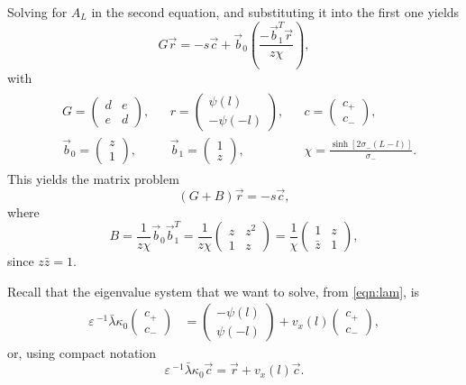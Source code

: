 \documentclass[a4paper,10pt]{article}
\newcommand{\lA}{\ensuremath{\lambda}}
\newcommand{\sI}{\ensuremath{\sigma}}
\newcommand{\kA}{\ensuremath{\kappa}}
\newcommand{\Ep}{\ensuremath{\varepsilon\,}}
\begin{document}
Solving for $A_L$ in the second equation, and substituting it into the first one yields
% 
\begin{equation*}
  G\vec{r} = -s\vec{c} + \vec{b}_0\left(\frac{-\vec{b}_1^T\vec{r}}{z\chi}\right),
\end{equation*}
% 
with 
% 
\begin{equation*}
	\begin{split}
	\begin{aligned}
	&G = \begin{pmatrix} d&e\\e&d\end{pmatrix},
	&&r = \begin{pmatrix} \psi(l)\\ -\psi(-l)\end{pmatrix},
	&&c = \begin{pmatrix} c_+\\ c_-\end{pmatrix},\\
	&\vec{b}_0 = \begin{pmatrix} z\\ 1\end{pmatrix},
	&&\vec{b}_1 = \begin{pmatrix} 1\\ z\end{pmatrix},
	&&\chi = \frac{\sinh[2\sI_-(L-l)]}{\sI_-}.
	\end{aligned}
	\end{split}
\end{equation*}
% 
This yields the matrix problem
% 
\begin{equation}
\label{eqn:reqn1}
  (G+B)\vec{r} = -s\vec{c},
\end{equation}
% 
where 
% 
\[
  B = \frac{1}{z\chi}\vec{b}_0\vec{b}_1^T = \frac{1}{z\chi}\begin{pmatrix} z&z^2\\1& z\end{pmatrix} =
  \frac{1}{\chi}\begin{pmatrix} 1&z\\ \bar{z}& 1\end{pmatrix},
\]
% 
since $z\bar{z}=1$.

Recall that the eigenvalue system that we want to solve, from \eqref{eqn:lam}, is
% 
\begin{equation*}
	\begin{split}
	\Ep^{-1}\bar{\lA}\kA_0\begin{pmatrix}c_+\\c_-\end{pmatrix}
   &=
	\begin{pmatrix} -\psi(l) \\ \psi(-l) \end{pmatrix}
	 +v_x(l) \begin{pmatrix}c_+\\c_-\end{pmatrix},
	\end{split}
\end{equation*}
%
or, using compact notation
% 
\begin{equation}
\label{eqn:reqn2}
 \Ep^{-1}\bar{\lA}\kA_0\vec{c} = \vec{r} + v_x(l)\vec{c}.
\end{equation}
% 
\end{document}
